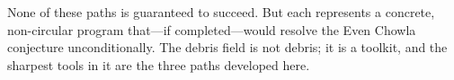 \documentclass[11pt,a4paper]{article}
\theoremstyle{definition}
\begin{document}
None of these paths is guaranteed to succeed. But each represents a concrete, non-circular program that---if completed---would resolve the Even Chowla conjecture unconditionally. The debris field is not debris; it is a toolkit, and the sharpest tools in it are the three paths developed here.

\end{document}
